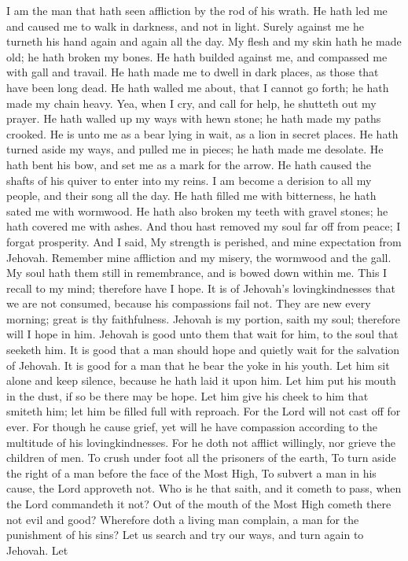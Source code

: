 I am the man that hath seen affliction by the rod of his wrath.  He hath led me and caused me to walk in darkness, and not in light.  Surely against me he turneth his hand again and again all the day.  My flesh and my skin hath he made old; he hath broken my bones.  He hath builded against me, and compassed me with gall and travail.  He hath made me to dwell in dark places, as those that have been long dead.  He hath walled me about, that I cannot go forth; he hath made my chain heavy.  Yea, when I cry, and call for help, he shutteth out my prayer.  He hath walled up my ways with hewn stone; he hath made my paths crooked.  He is unto me as a bear lying in wait, as a lion in secret places.  He hath turned aside my ways, and pulled me in pieces; he hath made me desolate.  He hath bent his bow, and set me as a mark for the arrow.  He hath caused the shafts of his quiver to enter into my reins.  I am become a derision to all my people, and their song all the day.  He hath filled me with bitterness, he hath sated me with wormwood.  He hath also broken my teeth with gravel stones; he hath covered me with ashes.  And thou hast removed my soul far off from peace; I forgat prosperity.  And I said, My strength is perished, and mine expectation from Jehovah.  Remember mine affliction and my misery, the wormwood and the gall.  My soul hath them still in remembrance, and is bowed down within me.  This I recall to my mind; therefore have I hope.  It is of Jehovah’s lovingkindnesses that we are not consumed, because his compassions fail not.  They are new every morning; great is thy faithfulness.  Jehovah is my portion, saith my soul; therefore will I hope in him.  Jehovah is good unto them that wait for him, to the soul that seeketh him.  It is good that a man should hope and quietly wait for the salvation of Jehovah.  It is good for a man that he bear the yoke in his youth.  Let him sit alone and keep silence, because he hath laid it upon him.  Let him put his mouth in the dust, if so be there may be hope.  Let him give his cheek to him that smiteth him; let him be filled full with reproach.  For the Lord will not cast off for ever.  For though he cause grief, yet will he have compassion according to the multitude of his lovingkindnesses.  For he doth not afflict willingly, nor grieve the children of men.  To crush under foot all the prisoners of the earth,  To turn aside the right of a man before the face of the Most High,  To subvert a man in his cause, the Lord approveth not.  Who is he that saith, and it cometh to pass, when the Lord commandeth it not?  Out of the mouth of the Most High cometh there not evil and good?  Wherefore doth a living man complain, a man for the punishment of his sins?  Let us search and try our ways, and turn again to Jehovah.  Let 